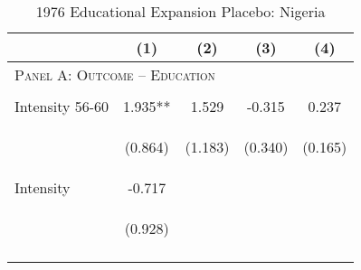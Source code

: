 \begin{subtables}
\begin{table}[htpb!]									
\begin{center}									
\caption{1976 Educational Expansion Placebo: Nigeria}									
\label{MMRtab:NigeriaPlacebo}									
\begin{tabular}{p{5cm}cccc}	\toprule								
	&	(1)	&	(2)	&	(3)	&	(4)	\\ \midrule
\multicolumn{5}{l}{\textsc{Panel A: Outcome -- Education}}									\\  
\vspace{4pt}	&	\begin{footnotesize}\end{footnotesize}	&	\begin{footnotesize}\end{footnotesize}	&	\begin{footnotesize}\end{footnotesize}	&	\begin{footnotesize}\end{footnotesize}	 \\
Intensity 56-60	&	1.935**	&	1.529	&	-0.315	&	0.237	 \\
	& \begin{footnotesize}	(0.864)	\end{footnotesize} & \begin{footnotesize}	(1.183)	\end{footnotesize} & \begin{footnotesize}	(0.340)	\end{footnotesize} & \begin{footnotesize}	(0.165)	\end{footnotesize} \\
Intensity  	&	-0.717	&		&		&		 \\
	& \begin{footnotesize}	(0.928)	\end{footnotesize} & \begin{footnotesize}		\end{footnotesize} & \begin{footnotesize}		\end{footnotesize} & \begin{footnotesize}		\end{footnotesize} \\
\vspace{4pt}	&	\begin{footnotesize}\end{footnotesize}	&	\begin{footnotesize}\end{footnotesize}	&	\begin{footnotesize}\end{footnotesize}	&	\begin{footnotesize}\end{footnotesize}	 \\

\end{tabular}
\end{center}
\end{table}
\end{subtables}
